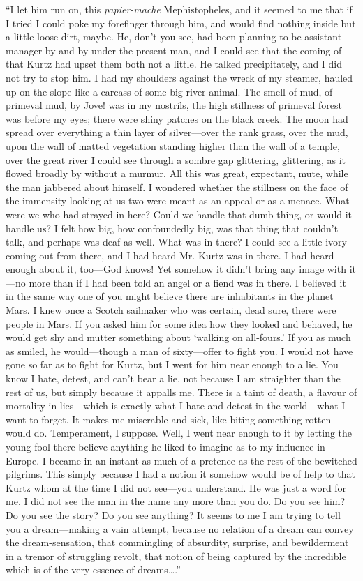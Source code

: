\documentclass[12pt]{report}
\begin{document}
``I let him run on, this \emph{papier-mache} Mephistopheles, and it
seemed to me that if I tried I could poke my forefinger through him, and
would find nothing inside but a little loose dirt, maybe. He, don't you
see, had been planning to be assistant-manager by and by under the
present man, and I could see that the coming of that Kurtz had upset
them both not a little. He talked precipitately, and I did not try to
stop him. I had my shoulders against the wreck of my steamer, hauled up
on the slope like a carcass of some big river animal. The smell of mud,
of primeval mud, by Jove! was in my nostrils, the high stillness of
primeval forest was before my eyes; there were shiny patches on the
black creek. The moon had spread over everything a thin layer of
silver---over the rank grass, over the mud, upon the wall of matted
vegetation standing higher than the wall of a temple, over the great
river I could see through a sombre gap glittering, glittering, as it
flowed broadly by without a murmur. All this was great, expectant, mute,
while the man jabbered about himself. I wondered whether the stillness
on the face of the immensity looking at us two were meant as an appeal
or as a menace. What were we who had strayed in here? Could we handle
that dumb thing, or would it handle us? I felt how big, how confoundedly
big, was that thing that couldn't talk, and perhaps was deaf as well.
What was in there? I could see a little ivory coming out from there, and
I had heard Mr. Kurtz was in there. I had heard enough about it,
too---God knows! Yet somehow it didn't bring any image with it---no more
than if I had been told an angel or a fiend was in there. I believed it
in the same way one of you might believe there are inhabitants in the
planet Mars. I knew once a Scotch sailmaker who was certain, dead sure,
there were people in Mars. If you asked him for some idea how they
looked and behaved, he would get shy and mutter something about `walking
on all-fours.' If you as much as smiled, he would---though a man of
sixty---offer to fight you. I would not have gone so far as to fight for
Kurtz, but I went for him near enough to a lie. You know I hate, detest,
and can't bear a lie, not because I am straighter than the rest of us,
but simply because it appalls me. There is a taint of death, a flavour
of mortality in lies---which is exactly what I hate and detest in the
world---what I want to forget. It makes me miserable and sick, like
biting something rotten would do. Temperament, I suppose. Well, I went
near enough to it by letting the young fool there believe anything he
liked to imagine as to my influence in Europe. I became in an instant as
much of a pretence as the rest of the bewitched pilgrims. This simply
because I had a notion it somehow would be of help to that Kurtz whom at
the time I did not see---you understand. He was just a word for me. I
did not see the man in the name any more than you do. Do you see him? Do
you see the story? Do you see anything? It seems to me I am trying to
tell you a dream---making a vain attempt, because no relation of a dream
can convey the dream-sensation, that commingling of absurdity, surprise,
and bewilderment in a tremor of struggling revolt, that notion of being
captured by the incredible which is of the very essence of
dreams\ldots{}.''
\end{document}
